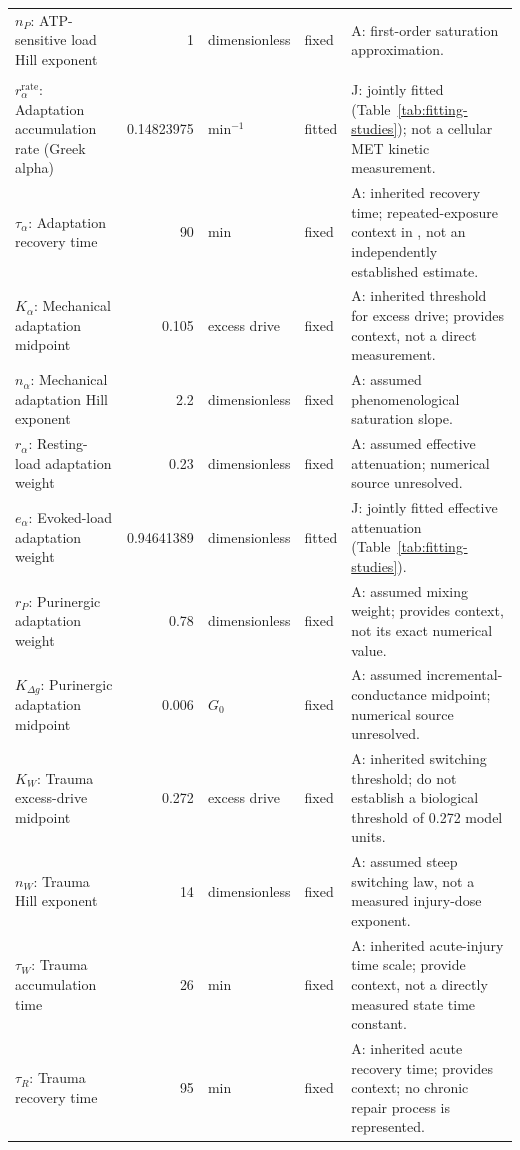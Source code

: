\begin{longtable}{@{}>{\raggedright\arraybackslash}p{4.4cm}r>{\raggedright\arraybackslash}p{2.0cm}>{\raggedright\arraybackslash}p{1.0cm}>{\raggedright\arraybackslash}p{8.0cm}@{}}
\(n_P\): ATP-sensitive load Hill exponent & 1 & dimensionless & fixed & A: first-order saturation approximation. \\
\addlinespace[4pt]\multicolumn{5}{@{}l}{\textbf{Adaptation and acoustic trauma}}\\*
\(r_\alpha^{\mathrm{rate}}\): Adaptation accumulation rate (Greek alpha) & 0.14823975 & min\(^{-1}\) & fitted & J: jointly fitted (Table~\ref{tab:fitting-studies}); not a cellular MET kinetic measurement. \\
\(\tau_\alpha\): Adaptation recovery time & 90 & min & fixed & A: inherited recovery time; repeated-exposure context in \citet{SaltKonishi1979}, not an independently established estimate. \\
\(K_\alpha\): Mechanical adaptation midpoint & 0.105 & excess drive & fixed & A: inherited threshold for excess drive; \citet{SaltKonishi1979} provides context, not a direct measurement. \\
\(n_\alpha\): Mechanical adaptation Hill exponent & 2.2 & dimensionless & fixed & A: assumed phenomenological saturation slope. \\
\(r_\alpha\): Resting-load adaptation weight & 0.23 & dimensionless & fixed & A: assumed effective attenuation; numerical source unresolved. \\
\(e_\alpha\): Evoked-load adaptation weight & 0.94641389 & dimensionless & fitted & J: jointly fitted effective attenuation (Table~\ref{tab:fitting-studies}). \\
\(r_P\): Purinergic adaptation weight & 0.78 & dimensionless & fixed & A: assumed mixing weight; \citet{Housley2013} provides context, not its exact numerical value. \\
\(K_{\Delta g}\): Purinergic adaptation midpoint & 0.006 & \(G_0\) & fixed & A: assumed incremental-conductance midpoint; numerical source unresolved. \\
\(K_W\): Trauma excess-drive midpoint & 0.272 & excess drive & fixed & A: inherited switching threshold; \citet{Wang1990,Wang1992} do not establish a biological threshold of 0.272 model units. \\
\(n_W\): Trauma Hill exponent & 14 & dimensionless & fixed & A: assumed steep switching law, not a measured injury-dose exponent. \\
\(\tau_W\): Trauma accumulation time & 26 & min & fixed & A: inherited acute-injury time scale; \citet{Wang1990,Wang1992} provide context, not a directly measured state time constant. \\
\(\tau_R\): Trauma recovery time & 95 & min & fixed & A: inherited acute recovery time; \citet{Wang1992} provides context; no chronic repair process is represented. \\

\end{longtable}
